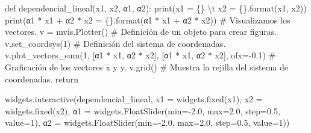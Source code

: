 \documentclass[
  letterpaper,
  DIV=11,
  numbers=noendperiod]{scrreprt}
\newenvironment{Shaded}{\begin{snugshade}}{\end{snugshade}}
\newcommand{\BuiltInTok}[1]{\textcolor[rgb]{0.00,0.23,0.31}{#1}}
\newcommand{\CharTok}[1]{\textcolor[rgb]{0.13,0.47,0.30}{#1}}
\newcommand{\CommentTok}[1]{\textcolor[rgb]{0.37,0.37,0.37}{#1}}
\newcommand{\ControlFlowTok}[1]{\textcolor[rgb]{0.00,0.23,0.31}{#1}}
\newcommand{\DecValTok}[1]{\textcolor[rgb]{0.68,0.00,0.00}{#1}}
\newcommand{\FloatTok}[1]{\textcolor[rgb]{0.68,0.00,0.00}{#1}}
\newcommand{\KeywordTok}[1]{\textcolor[rgb]{0.00,0.23,0.31}{#1}}
\newcommand{\NormalTok}[1]{\textcolor[rgb]{0.00,0.23,0.31}{#1}}
\newcommand{\OperatorTok}[1]{\textcolor[rgb]{0.37,0.37,0.37}{#1}}
\newcommand{\SpecialCharTok}[1]{\textcolor[rgb]{0.37,0.37,0.37}{#1}}
\newcommand{\StringTok}[1]{\textcolor[rgb]{0.13,0.47,0.30}{#1}}
\begin{document}
\begin{Shaded}
\begin{Highlighting}[]
\KeywordTok{def}\NormalTok{ dependencial\_lineal(x1, x2, α}\DecValTok{1}\NormalTok{, α}\DecValTok{2}\NormalTok{):}
    \BuiltInTok{print}\NormalTok{(}\StringTok{\textquotesingle{}x1 = }\SpecialCharTok{\{\}}\StringTok{ }\CharTok{\textbackslash{}t}\StringTok{ x2 = }\SpecialCharTok{\{\}}\StringTok{\textquotesingle{}}\NormalTok{.}\BuiltInTok{format}\NormalTok{(x1, x2))}
    \BuiltInTok{print}\NormalTok{(}\StringTok{\textquotesingle{}α1 * x1 + α2 * x2 = }\SpecialCharTok{\{\}}\StringTok{\textquotesingle{}}\NormalTok{.}\BuiltInTok{format}\NormalTok{(α}\DecValTok{1} \OperatorTok{*}\NormalTok{ x1 }\OperatorTok{+}\NormalTok{ α}\DecValTok{2} \OperatorTok{*}\NormalTok{ x2))}
    \CommentTok{\# Visualizamos los vectores.}
\NormalTok{    v }\OperatorTok{=}\NormalTok{ mvis.Plotter()  }\CommentTok{\# Definición de un objeto para crear figuras.}
\NormalTok{    v.set\_coordsys(}\DecValTok{1}\NormalTok{)   }\CommentTok{\# Definición del sistema de coordenadas.}
\NormalTok{    v.plot\_vectors\_sum(}\DecValTok{1}\NormalTok{, [α}\DecValTok{1} \OperatorTok{*}\NormalTok{ x1, α}\DecValTok{2} \OperatorTok{*}\NormalTok{ x2], [}\StringTok{\textquotesingle{}α1 * x1\textquotesingle{}}\NormalTok{, }\StringTok{\textquotesingle{}α2 * x2\textquotesingle{}}\NormalTok{], ofx}\OperatorTok{={-}}\FloatTok{0.1}\NormalTok{) }\CommentTok{\# Graficación de los vectores \textquotesingle{}x\textquotesingle{} y \textquotesingle{}y\textquotesingle{}.}
\NormalTok{    v.grid()  }\CommentTok{\# Muestra la rejilla del sistema de coordenadas.}
    \ControlFlowTok{return} 

\NormalTok{widgets.interactive(dependencial\_lineal,}
\NormalTok{                    x1 }\OperatorTok{=}\NormalTok{ widgets.fixed(x1),}
\NormalTok{                    x2 }\OperatorTok{=}\NormalTok{ widgets.fixed(x2),}
\NormalTok{                    α}\DecValTok{1} \OperatorTok{=}\NormalTok{ widgets.FloatSlider(}\BuiltInTok{min}\OperatorTok{={-}}\FloatTok{2.0}\NormalTok{, }\BuiltInTok{max}\OperatorTok{=}\FloatTok{2.0}\NormalTok{, step}\OperatorTok{=}\FloatTok{0.5}\NormalTok{, value}\OperatorTok{=}\DecValTok{1}\NormalTok{),}
\NormalTok{                    α}\DecValTok{2} \OperatorTok{=}\NormalTok{ widgets.FloatSlider(}\BuiltInTok{min}\OperatorTok{={-}}\FloatTok{2.0}\NormalTok{, }\BuiltInTok{max}\OperatorTok{=}\FloatTok{2.0}\NormalTok{, step}\OperatorTok{=}\FloatTok{0.5}\NormalTok{, value}\OperatorTok{=}\DecValTok{1}\NormalTok{))}
\end{Highlighting}
\end{Shaded}
\end{document}
